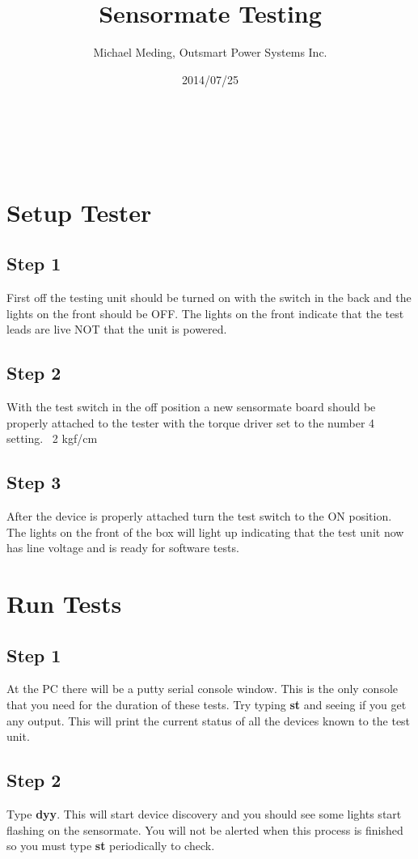 \documentclass[a4paper,11pt]{article}
\makeatletter
\renewcommand{\maketitle}{
\begin{center}
\vspace{2ex}
{\huge \textsc{\@title}}
\vspace{1ex}
\\
\linia\\
\@author \hfill \@date
\vspace{4ex}
\end{center}
}
\makeatother
\begin{document}
\title{Sensormate Testing}

\author{Michael Meding, Outsmart Power Systems Inc.}

\date{2014/07/25}

\maketitle

\section*{Setup Tester}
\subsection*{Step 1}
First off the testing unit should be turned on with the switch in the back and the lights on the front should be OFF. The lights on the front indicate that the test leads are live NOT that the unit is powered.
\subsection*{Step 2}
With the test switch in the off position a new  sensormate board should be properly attached to the tester with the torque driver set to the number 4 setting. ~2 kgf/cm
\subsection*{Step 3}
After the device is properly attached turn the test switch to the ON position. The lights on the front of the box will light up indicating that the test unit now has line voltage and is ready for software tests.

\section*{Run Tests}
\subsection*{Step 1}
At the PC there will be a putty serial console window. This is the only console that you need for the duration of these tests. Try typing \textbf{st} and seeing if you get any output. This will print the current status of all the devices known to the test unit. 
\subsection*{Step 2}
Type \textbf{dyy}. This will start device discovery and you should see some lights start flashing on the sensormate. You will not be alerted when this process is finished so you must type \textbf{st} periodically to check.
\end{document}
